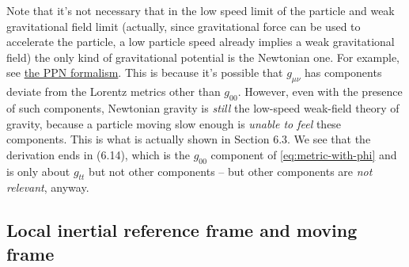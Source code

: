 \documentclass[hyperref, a4paper]{article}
\begin{document}
Note that it's not necessary that in the low speed limit of the particle and weak gravitational field limit
(actually, since gravitational force can be used to accelerate the particle, a low particle speed already 
implies a weak gravitational field) the only kind of gravitational potential is the Newtonian one.
For example, see \href{https://en.wikipedia.org/wiki/Parameterized\_post-Newtonian\_formalism}{the PPN formalism}.
This is because it's possible that $g_{\mu \nu}$ has components deviate from the Lorentz metrics other 
than $g_{00}$. However, even with the presence of such components, Newtonian gravity is \emph{still} 
the low-speed weak-field theory of gravity, because a particle moving slow enough is \emph{unable to feel} 
these components. This is what is actually shown in Section 6.3. 
We see that the derivation ends in (6.14), which is the $g_{00}$ component of \eqref{eq:metric-with-phi} 
and is only about $g_{tt}$ but not other components -- but other components are \emph{not relevant}, anyway.

\subsection{Local inertial reference frame and moving frame}
\end{document}
